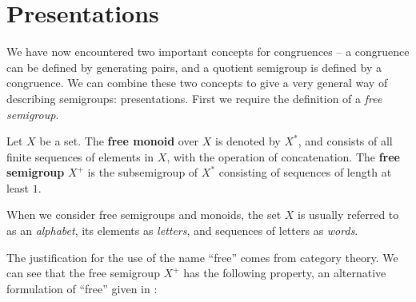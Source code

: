 \section{Presentations}
\label{sec:intro-presentations}

We have now encountered two important concepts for congruences -- a congruence
can be defined by generating pairs, and a quotient semigroup is defined by a
congruence.  We can combine these two concepts to give a very general way of
describing semigroups: presentations.  First we require the definition of a
\textit{free semigroup}.

\begin{definition}
  \label{def:free}
  Let $X$ be a set.  The \textbf{free monoid} over $X$ is denoted by $X^*$, and
  consists of all finite sequences of elements in $X$, with the operation of
  concatenation.  The \textbf{free semigroup} $X^+$ is the subsemigroup of $X^*$
  consisting of sequences of length at least $1$.
\end{definition}

When we consider free semigroups and monoids, the set $X$ is usually referred to
as an \textit{alphabet}, its elements as \textit{letters}, and sequences of
letters as \textit{words}.

The justification for the use of the name ``free'' comes from category theory.
We can see that the free semigroup $X^+$ has the following property, an
alternative formulation of ``free'' given in \cite[\S 1.6]{howie}:

